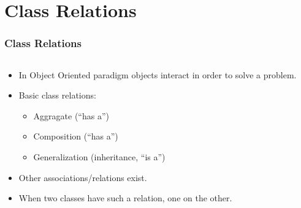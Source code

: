 \section{Class Relations}
\begin{frame}
\frametitle{Class Relations}
\begin{columns}
\begin{column}{70mm}
\begin{itemize}
\item In Object Oriented  paradigm objects
interact in order to solve a problem.
\item Basic class relations:
\begin{itemize}
\item Aggragate (``has a'')
\item Composition (``has a'')
\item Generalization (inheritance, ``is a'')
\end{itemize}
\item Other associations/relations exist.
\item When two classes have such a relation, one  on
	the other.
\end{itemize}
\end{column}
\begin{column}{55mm}
\renewcommand{\umldrawcolor}{red!50!black}
\tiny
{}\vspace*{1.5em}
\end{column}
\end{columns}
\end{frame}
